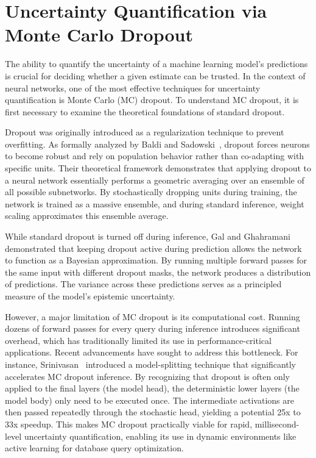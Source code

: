 \section{Uncertainty Quantification via Monte Carlo Dropout}

The ability to quantify the uncertainty of a machine learning model's predictions is crucial for deciding whether a given estimate can be trusted. In the context of neural networks, one of the most effective techniques for uncertainty quantification is Monte Carlo (MC) dropout. To understand MC dropout, it is first necessary to examine the theoretical foundations of standard dropout.

Dropout was originally introduced as a regularization technique to prevent overfitting. As formally analyzed by Baldi and Sadowski~\cite{DBLP:journals/ai/BaldiS14}, dropout forces neurons to become robust and rely on population behavior rather than co-adapting with specific units. Their theoretical framework demonstrates that applying dropout to a neural network essentially performs a geometric averaging over an ensemble of all possible subnetworks. By stochastically dropping units during training, the network is trained as a massive ensemble, and during standard inference, weight scaling approximates this ensemble average.

While standard dropout is turned off during inference, Gal and Ghahramani~\cite{gal2016dropout} demonstrated that keeping dropout active during prediction allows the network to function as a Bayesian approximation. By running multiple forward passes for the same input with different dropout masks, the network produces a distribution of predictions. The variance across these predictions serves as a principled measure of the model's epistemic uncertainty.

However, a major limitation of MC dropout is its computational cost. Running dozens of forward passes for every query during inference introduces significant overhead, which has traditionally limited its use in performance-critical applications. Recent advancements have sought to address this bottleneck. For instance, Srinivasan~\cite{Srinivasan2024Efficient} introduced a model-splitting technique that significantly accelerates MC dropout inference. By recognizing that dropout is often only applied to the final layers (the model head), the deterministic lower layers (the model body) only need to be executed once. The intermediate activations are then passed repeatedly through the stochastic head, yielding a potential 25x to 33x speedup. This makes MC dropout practically viable for rapid, millisecond-level uncertainty quantification, enabling its use in dynamic environments like active learning for database query optimization.

